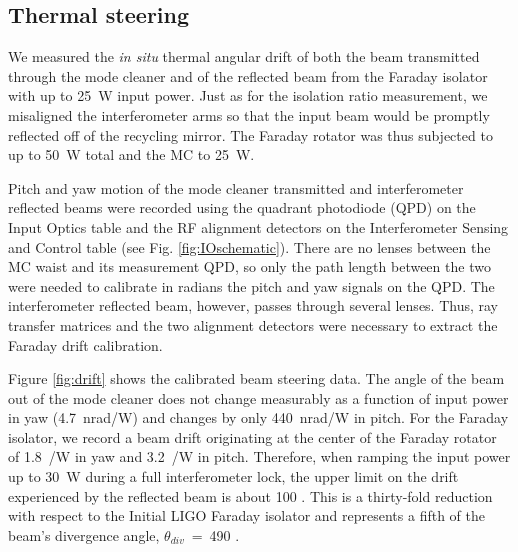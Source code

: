 \subsection{Thermal steering}
We measured the \emph{in situ} thermal angular drift of both the beam
transmitted through the mode cleaner and of the reflected beam from
the Faraday isolator with up to 25~W input power. Just as for the
isolation ratio measurement, we misaligned the interferometer arms so
that the input beam would be promptly reflected off of the recycling
mirror. The Faraday rotator was thus subjected to up to 50~W total
and the MC to 25~W. 

Pitch and yaw motion of the mode cleaner transmitted and
interferometer reflected beams were recorded using the quadrant
photodiode (QPD) on the Input Optics table and the RF alignment
detectors on the Interferometer Sensing and Control table (see
Fig. \ref{fig:IOschematic}). There are no lenses between the MC waist
and its measurement QPD, so only the path length between the two were
needed to calibrate in radians the pitch and yaw signals on the
QPD. The interferometer reflected beam, however, passes through
several lenses. Thus, ray transfer matrices and the two alignment
detectors were necessary to extract the Faraday drift calibration.

Figure \ref{fig:drift} shows the calibrated beam steering data. The
angle of the beam out of the mode cleaner does not change measurably
as a function of input power in yaw (4.7~nrad/W) and changes by only
440~nrad/W in pitch. For the Faraday isolator, we record a beam drift
originating at the center of the Faraday rotator of 1.8~\microrad/W in
yaw and 3.2~\microrad/W in pitch. Therefore, when ramping the input
power up to 30~W during a full interferometer lock, the upper limit on
the drift experienced by the reflected beam is about 100
\microrad. This is a thirty-fold reduction with respect to the Initial
LIGO Faraday isolator and represents a fifth of the beam's divergence
angle, $\theta_{div}$~=~490 \microrad.

